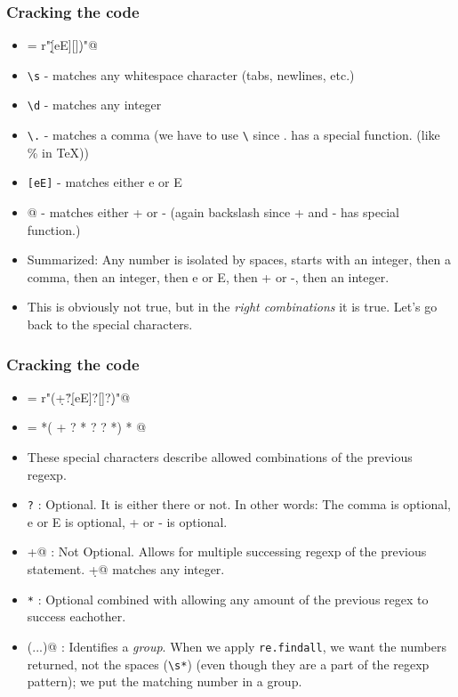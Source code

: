 \documentclass{beamer}
\begin{document}
\begin{frame}[fragile]
\frametitle{Cracking the code}
\scriptsize
\begin{itemize}
 \item \verb@anyNumber = r"\s\d\.\d[eE][\-\+]\d)\s"@
 \pause \item \verb+\s+ - matches any whitespace character (tabs, newlines, etc.)
 \pause \item \verb+\d+ - matches any integer
 \pause \item \verb+\.+ - matches a comma (we have to use \verb+\+ since . has a special function. (like \% in TeX))
 \pause \item \verb+[eE]+ - matches either e or E 
 \item \verb@[\+\-]@ - matches either + or - (again backslash since + and - has special function.)
 \pause \item Summarized: Any number is isolated by spaces, starts with an integer, then a comma, then an integer, then e or E, then + or -, then an integer.
 \item This is obviously not true, but in the \textit{right combinations} it is true. Let's go back to the special characters.
\end{itemize}
\normalsize
\end{frame}

\begin{frame}[fragile]
\frametitle{Cracking the code}
\scriptsize
\begin{itemize}
 \item \verb@anyNumber = r"\s*(\d+\.?\d*[eE]?[\-\+]?\d*)\s*"@
 \pause \item \verb@anyNumber =     *(  +  ?  *    ?      ?  *)  * @  
 \item These special characters describe allowed combinations of the previous regexp.
 \pause \item \verb+?+ : Optional. It is either there or not. In other words: The comma is optional, e or E is optional, + or - is optional.
 \pause \item \verb@+@ : Not Optional. Allows for multiple successing regexp of the previous statement. \verb@\d+@ matches any integer.
 \pause \item \verb+*+ : Optional combined with allowing any amount of the previous regex to success eachother.
 \pause \item \verb@(...)@ : Identifies a \textit{group}. When we apply \verb+re.findall+, we want the numbers returned, not the spaces (\verb+\s*+) (even though they are a part of the regexp pattern); we put the matching number in a group.
\end{itemize}
\normalsize
\end{frame}
\end{document}
